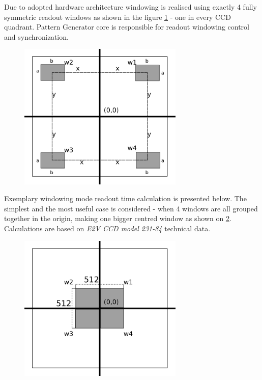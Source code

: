 Due to adopted hardware architecture windowing is realised using exactly 4 fully symmetric readout windows as shown in the figure \ref{fig:windowing} - one in every CCD quadrant. Pattern Generator core is responsible for readout windowing control and synchronization.

\begin{figure}[ht!]
\centering
\includegraphics[width=0.7\textwidth]{pict/windowing.png}
\caption{}
\label{fig:windowing}
\end{figure}

Exemplary windowing mode readout time calculation is presented below. The simplest and the most useful case is considered - when 4 windows are all grouped together in the origin, making one bigger centred window as shown on \ref{fig:windowing2}. Calculations are based on \emph{E2V CCD model 231-84} technical data.

\begin{figure}[ht!]
\centering
\includegraphics[width=0.7\textwidth]{pict/windowing2.png}
\caption{}
\label{fig:windowing2}
\end{figure}

